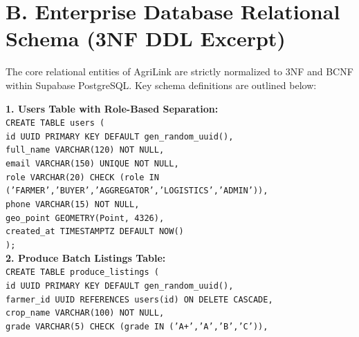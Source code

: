{\section*{B. Enterprise Database Relational Schema (3NF DDL Excerpt)}
\label{sec:appendix_sql}
The core relational entities of AgriLink are strictly normalized to 3NF and BCNF within Supabase PostgreSQL. Key schema definitions are outlined below:

\vspace{0.3cm}
\begin{singlespace}
\noindent\textbf{1. Users Table with Role-Based Separation:}\\
\texttt{CREATE TABLE users (}\\
\hspace*{0.6cm}\texttt{id UUID PRIMARY KEY DEFAULT gen\_random\_uuid(),}\\
\hspace*{0.6cm}\texttt{full\_name VARCHAR(120) NOT NULL,}\\
\hspace*{0.6cm}\texttt{email VARCHAR(150) UNIQUE NOT NULL,}\\
\hspace*{0.6cm}\texttt{role VARCHAR(20) CHECK (role IN ('FARMER','BUYER','AGGREGATOR','LOGISTICS','ADMIN')),}\\
\hspace*{0.6cm}\texttt{phone VARCHAR(15) NOT NULL,}\\
\hspace*{0.6cm}\texttt{geo\_point GEOMETRY(Point, 4326),}\\
\hspace*{0.6cm}\texttt{created\_at TIMESTAMPTZ DEFAULT NOW()}\\
\texttt{);}\\[0.3cm]
\noindent\textbf{2. Produce Batch Listings Table:}\\
\texttt{CREATE TABLE produce\_listings (}\\
\hspace*{0.6cm}\texttt{id UUID PRIMARY KEY DEFAULT gen\_random\_uuid(),}\\
\hspace*{0.6cm}\texttt{farmer\_id UUID REFERENCES users(id) ON DELETE CASCADE,}\\
\hspace*{0.6cm}\texttt{crop\_name VARCHAR(100) NOT NULL,}\\
\hspace*{0.6cm}\texttt{grade VARCHAR(5) CHECK (grade IN ('A+','A','B','C')),}\\

\end{singlespace}}
